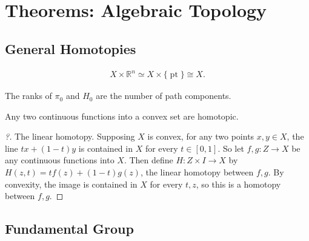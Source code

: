 \hypertarget{theorems-algebraic-topology}{%
\section{Theorems: Algebraic
Topology}\label{theorems-algebraic-topology}}

\hypertarget{general-homotopies}{%
\subsection{General Homotopies}\label{general-homotopies}}

\begin{fact}

\begin{align*}
X\times{\mathbb{R}}^n \simeq X \times{\{\operatorname{pt}\}}\cong X
.\end{align*}

\end{fact}

\begin{fact}

The ranks of \(\pi_{0}\) and \(H_{0}\) are the number of path
components.

\end{fact}

\begin{theorem}

Any two continuous functions into a convex set are homotopic.

\end{theorem}

\begin{proof}[?]

The linear homotopy. Supposing \(X\) is convex, for any two points
\(x,y\in X\), the line \(tx + (1-t)y\) is contained in \(X\) for every
\(t\in[0,1]\). So let \(f, g: Z \to X\) be any continuous functions into
\(X\). Then define \(H: Z \times I \to X\) by
\(H(z,t) = tf(z) + (1-t)g(z)\), the linear homotopy between \(f,g\). By
convexity, the image is contained in \(X\) for every \(t,z\), so this is
a homotopy between \(f,g\).

\end{proof}

\hypertarget{fundamental-group}{%
\subsection{Fundamental Group}\label{fundamental-group}}

